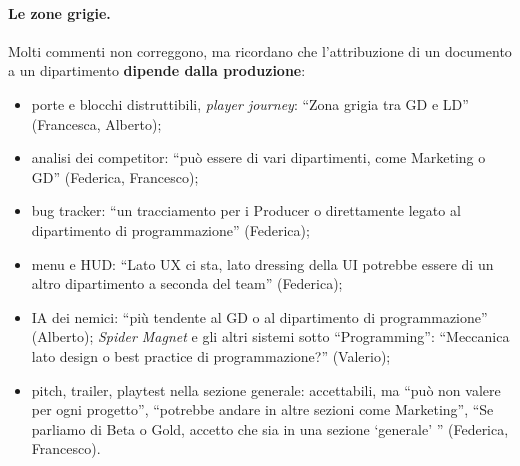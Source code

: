 \paragraph{Le zone grigie.} Molti commenti non correggono, ma ricordano che
l'attribuzione di un documento a un dipartimento \textbf{dipende dalla
produzione}:
\begin{itemize}
  \item porte e blocchi distruttibili, \emph{player journey}: ``Zona grigia
        tra GD e LD'' (Francesca, Alberto);
  \item analisi dei competitor: ``può essere di vari dipartimenti, come
        Marketing o GD'' (Federica, Francesco);
  \item bug tracker: ``un tracciamento per i Producer o direttamente legato
        al dipartimento di programmazione'' (Federica);
  \item menu e HUD: ``Lato UX ci sta, lato dressing della UI potrebbe essere
        di un altro dipartimento a seconda del team'' (Federica);
  \item IA dei nemici: ``più tendente al GD o al dipartimento di
        programmazione'' (Alberto); \emph{Spider Magnet} e gli altri sistemi
        sotto ``Programming'': ``Meccanica lato design o best practice di
        programmazione?'' (Valerio);
  \item pitch, trailer, playtest nella sezione generale: accettabili, ma
        ``può non valere per ogni progetto'', ``potrebbe andare in altre
        sezioni come Marketing'', ``Se parliamo di Beta o Gold, accetto che
        sia in una sezione `generale' '' (Federica, Francesco).
\end{itemize}

